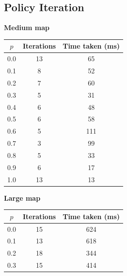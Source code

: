 \documentclass[11pt]{article}
\def \hfillx {\hspace*{-\textwidth} \hfill}
\begin{document}
\subsection{Policy Iteration}

\begin{table}[h!]
    \begin{minipage}{0.5\textwidth}
        \centering
        \textbf{Medium map}\\
        \begin{tabular}{@{}c|cc@{}}
        \toprule
        \textbf{$p$} & \textbf{Iterations} & \textbf{Time taken (ms)} \\ \midrule
        0.0          & 13       & 65                     \\
        0.1          & 8       & 52                     \\
        0.2          & 7       & 60                     \\
        0.3          & 5       & 31                     \\
        0.4          & 6       & 48                     \\
        0.5          & 6       & 58                     \\
        0.6          & 5       & 111                     \\
        0.7          & 3       & 99                     \\
        0.8          & 5       & 33                     \\
        0.9          & 6       & 17                     \\
        1.0          & 13       & 13                     \\ \bottomrule
        \end{tabular}
    \end{minipage}
    \hfillx
    \begin{minipage}{0.5\textwidth}
        \centering
        \textbf{Large map}\\
        \begin{tabular}{@{}c|cc@{}}
        \toprule
        \textbf{$p$} & \textbf{Iterations} & \textbf{Time taken (ms)} \\ \midrule
        0.0          & 15       & 624                     \\
        0.1          & 13       & 618                     \\
        0.2          & 18       & 344                     \\
        0.3          & 15       & 414                     \\

\end{tabular}
\end{minipage}
\end{table}
\end{document}
